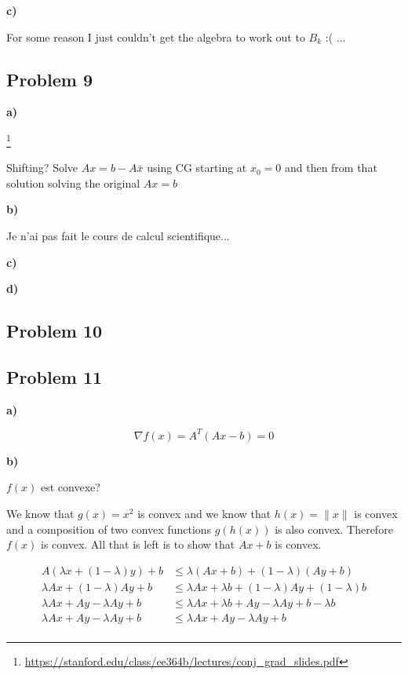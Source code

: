 \textbf{c)}

For some reason I just couldn't get the algebra to work out to $B_k$ :( ...

\subsection{Problem 9}

\textbf{a)}

\answer \footnote{\url{https://stanford.edu/class/ee364b/lectures/conj_grad_slides.pdf}}

Shifting? Solve $Ax = b - A\bar{x}$ using CG starting at $x_0 = 0$ and then from that solution solving the original $Ax = b$

\textbf{b)}

\answer

Je n'ai pas fait le cours de calcul scientifique...

\textbf{c)}

\incomplete

\textbf{d)}

\incomplete

\subsection{Problem 10}

\incomplete

\subsection{Problem 11}

\textbf{a)}

\answer

\[
	\nabla f(x) = A^T(Ax-b) = 0
\]

\textbf{b)}

$f(x)$ est convexe?

\answer

We know that $g(x) = x^2$ is convex and we know that $h(x) = \| x \|$ is convex and a composition of two convex functions $g(h(x))$ is also convex. Therefore $f(x)$ is convex. All that is left is to show that $Ax+b$ is convex.

\begin{align*}
	A(\lambda x + (1-\lambda )y) + b & \leq \lambda (Ax+b) + (1-\lambda ) (Ay+b) \\
	\lambda Ax + (1-\lambda) A y + b & \leq \lambda Ax + \lambda b + (1-\lambda)Ay + (1-\lambda)b \\
	\lambda Ax + Ay - \lambda A y + b &\leq \lambda Ax + \lambda b + Ay - \lambda A y + b - \lambda b \\
	\lambda Ax + Ay - \lambda A y + b &\leq \lambda Ax + Ay - \lambda A y + b \\
\end{align*}

